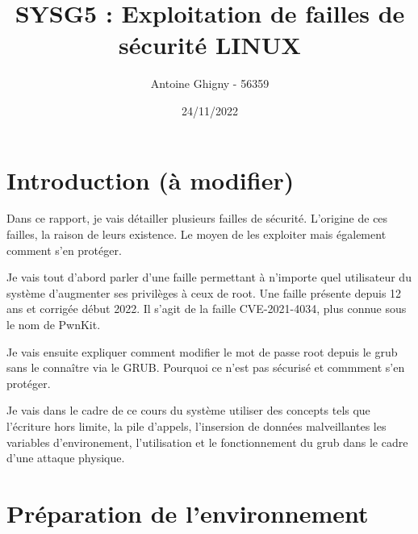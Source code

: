 \documentclass[12pt,a4paper]{article}
\title{SYSG5 : Exploitation de failles de sécurité LINUX}
\author{Antoine Ghigny - 56359}          \let\Author\@author
\date{24/11/2022}           \let\Date\@date
\begin{document}
\maketitle 
   \newpage
   \tableofcontents
    \newpage
   \section{Introduction (à modifier)}
   \begin{flushleft}
       \noindent Dans ce rapport, je vais détailler plusieurs failles de sécurité. L'origine de ces failles, la raison de leurs existence. Le moyen de les exploiter mais également comment s'en protéger.
       \item Je vais tout d'abord parler d'une faille permettant à n'importe quel utilisateur du système d'augmenter ses privilèges à ceux de root. Une faille présente depuis 12 ans et corrigée début 2022. Il s'agit de la faille CVE-2021-4034, plus connue sous le nom de PwnKit.
       \item Je vais ensuite expliquer comment modifier le mot de passe root depuis le grub sans le connaître via le GRUB. Pourquoi ce n'est pas sécurisé et commment s'en protéger. 
       \item Je vais dans le cadre de ce cours du système utiliser des concepts tels que l'écriture hors limite, la pile d'appels, l'insersion de données malveillantes les variables d'environement, l'utilisation et le fonctionnement du grub dans le cadre d'une attaque physique.
   \end{flushleft}

   \section{Préparation de l'environnement}
\end{document}
